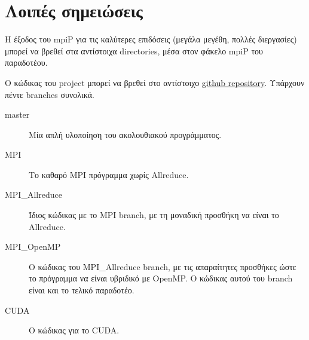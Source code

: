 \clearpage
\section*{Λοιπές σημειώσεις}
Η έξοδος του mpiP για τις καλύτερες επιδόσεις (μεγάλα μεγέθη, πολλές διεργασίες) μπορεί να βρεθεί στα αντίστοιχα directories, μέσα στον φάκελο mpiP του παραδοτέου. \par
Ο κώδικας του project μπορεί να βρεθεί στο αντίστοιχο \href{https://github.com/vasra/GameOfLife}{github repository}. Υπάρχουν πέντε branches συνολικά. 
\begin{description}
\item[master] Μία απλή υλοποίηση του ακολουθιακού προγράμματος.
\item[MPI] Το καθαρό MPI πρόγραμμα χωρίς Allreduce.
\item[MPI\_Allreduce] Ίδιος κώδικας με το MPI branch, με τη μοναδική προσθήκη να είναι το Allreduce.
\item[MPI\_OpenMP] Ο κώδικας του MPI\_Allreduce branch, με τις απαραίτητες προσθήκες ώστε το πρόγραμμα να είναι υβριδικό με OpenMP. Ο κώδικας αυτού του branch είναι και το τελικό παραδοτέο.
\item[CUDA] Ο κώδικας για το CUDA.
\end{description}